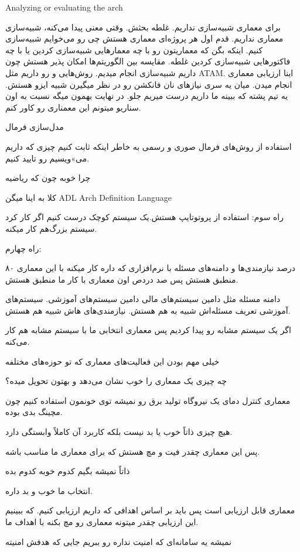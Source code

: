 \documentclass[a4paper]{article}
\begin{document}
Analyzing or evaluating the arch

برای معماری شبیه‌سازی نداریم. غلطه بحثش. وقتی معنی پیدا می‌کنه، شبیه‌سازی معماری
نداریم. قدم اول هر پروژه‌ای معماری هستش چی رو می‌خوایم شبیه‌سازی کنیم. اینکه بگن
که معماریتون رو با چه معمار‌هایی شبیه‌سازی کردین یا با چه فاکتور‌هایی شبیه‌سازی
کردین غلطه. مقایسه بین الگوریتم‌ها امکان پذیر هستش چون داریم شبیه‌سازی انجام
میدیم. روش‌هایی و رو داریم مثل ATAM. اینا ارزیابی معماری انجام میدن. میان یه سری
نیاز‌های نان فانکشن رو در نظر میگیرن شبیه ایزو هستش. یه تیم پشته که ببینه ما
داریم درست میریم جلو. در نهایت بهمون میگه نسبت به اون سناریو میتونم این معمناری
رو کاور کنم. 

مدل‌سازی فرمال

استفاده از روش‌های فرمال صوری و رسمی به خاطر اینکه ثابت کنیم چیزی که داریم
می‌»ویسیم رو تایید کنیم.

چرا خوبه چون که ریاضیه

کلا به اینا میگن ADL Arch Definition Language

راه سوم: استفاده از پروتوتایپ هستش.یک سیستم کوچک درست کنیم اگر کار کرد سیستم
بزرگ‌هم کار میکنه.

راه چهارم:

۸۰ درصد نیازمندی‌ها و دامنه‌های مسئله با نرم‌افزاری که داره کار میکنه با این
معماری منطبق هستش پس صد دردص اون معماری با کار ما منطبق هستش.

دامنه مسئله مثل دامین سیستم‌های مالی دامین سیستم‌های آموزشی. سیستم‌های آموزشی
تعریف مسئله‌اش شبیه به هم هستش. نیازمند‌ی‌های هاش شبیه هم هستش.

اگر یک سیستم مشابه رو پیدا کردیم پس معماری انتخابی ما با سیستم مشابه هم کار
می‌کنه.

خیلی مهم بودن این فعالیت‌های معماری که تو حوزه‌های مختلفه

چه چیزی یک ممعاری را خوب نشان می‌دهد و بهتون تحویل میده؟

معماری کنترل دمای یک نیرو‌گاه تولید برق رو نمیشه توی خونمون استفاده کنیم چون
مچینگ بدی بوده.

هیچ چیزی ذاتاً خوب یا بد نیست بلکه کاربرد آن کاملاً وابستگی دارد.

پس این معماری چقدر فیت و مچ هستش که برای معماری ما مناسب باشه. 

ذاتاً نمیشه بگیم کدوم خوبه کدوم بده

انتخاب ما خوب و بد داره.

معماری قابل ارزیابی است پس باید بر اساس اهدافی که داریم ارزیابی کنیم. که ببینیم
این ارزیابی چقدر میتونه معماری رو مچ بکنه با اهداف ما.

نمیشه یه سامانه‌ای که امنیت نداره رو ببریم جایی که هدفش امنیته
\end{document}
